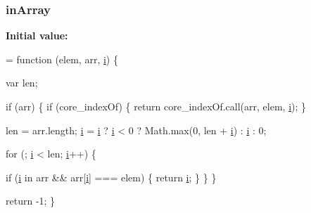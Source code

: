 \subsubsection[{\texorpdfstring{in\+Array}{inArray}}]{ in\+Array}\hypertarget{jquery-2_82_81-vsdoc_8js_a8203f20935038ea9f23057d6b9bd0c35}{}\label{jquery-2_82_81-vsdoc_8js_a8203f20935038ea9f23057d6b9bd0c35}
{\bfseries Initial value\+:}
\begin{DoxyCode}
= \textcolor{keyword}{function} (elem, arr, \hyperlink{geolocation-marker_8js_a0325b7ce0988782a8032e720ef3aa411}{i}) \{
        

        var len;

        \textcolor{keywordflow}{if} (arr) \{
            \textcolor{keywordflow}{if} (core\_indexOf) \{
                \textcolor{keywordflow}{return} core\_indexOf.call(arr, elem, \hyperlink{geolocation-marker_8js_a0325b7ce0988782a8032e720ef3aa411}{i});
            \}

            len = arr.length;
            \hyperlink{geolocation-marker_8js_a0325b7ce0988782a8032e720ef3aa411}{i} = \hyperlink{geolocation-marker_8js_a0325b7ce0988782a8032e720ef3aa411}{i} ? \hyperlink{geolocation-marker_8js_a0325b7ce0988782a8032e720ef3aa411}{i} < 0 ? Math.max(0, len + \hyperlink{geolocation-marker_8js_a0325b7ce0988782a8032e720ef3aa411}{i}) : \hyperlink{geolocation-marker_8js_a0325b7ce0988782a8032e720ef3aa411}{i} : 0;

            \textcolor{keywordflow}{for} (; \hyperlink{geolocation-marker_8js_a0325b7ce0988782a8032e720ef3aa411}{i} < len; \hyperlink{geolocation-marker_8js_a0325b7ce0988782a8032e720ef3aa411}{i}++) \{
                
                \textcolor{keywordflow}{if} (\hyperlink{geolocation-marker_8js_a0325b7ce0988782a8032e720ef3aa411}{i} in arr && arr[\hyperlink{geolocation-marker_8js_a0325b7ce0988782a8032e720ef3aa411}{i}] === elem) \{
                    \textcolor{keywordflow}{return} \hyperlink{geolocation-marker_8js_a0325b7ce0988782a8032e720ef3aa411}{i};
                \}
            \}
        \}

        \textcolor{keywordflow}{return} -1;
    \}
\end{DoxyCode}
